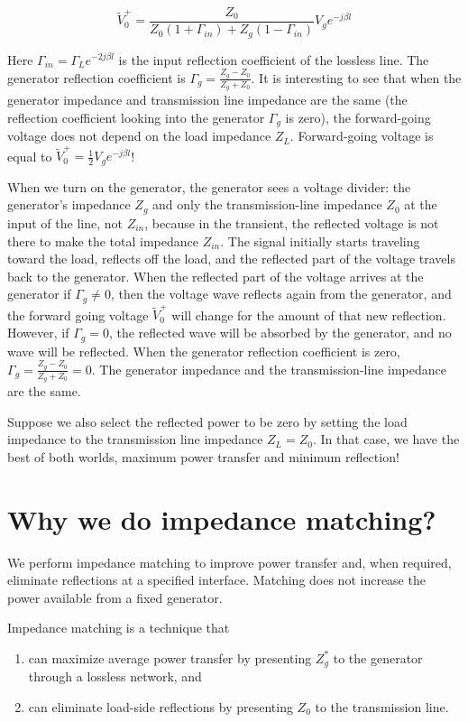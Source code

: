 \documentclass{ximera}
\begin{document}
\begin{equation}
\tilde{V}_0^+=\frac{Z_0}{Z_0(1+\Gamma_{in})+Z_g(1-\Gamma_{in})}V_g e^{-j\beta l}\label{eq:inputrefl}
\end{equation}

Here $\Gamma_{in}=\Gamma_L e^{-2j\beta l}$ is the input reflection coefficient of the lossless line. The generator reflection coefficient is $\Gamma_g=\frac{Z_g-Z_0}{Z_g+Z_0}$. It is interesting to see that when the generator impedance and transmission line impedance are the same (the reflection coefficient looking into the generator $\Gamma_{g}$ is zero), the forward-going voltage does not depend on the load impedance $Z_L$. Forward-going voltage is equal to $\tilde{V}_0^+=\frac{1}{2} V_g e^{-j \beta l}$!

When we turn on the generator, the generator sees a voltage divider: the generator's impedance $Z_g$ and only the transmission-line impedance $Z_0$ at the input of the line, not $Z_{in}$, because in the transient, the reflected voltage is not there to make the total impedance $Z_{in}$. The signal initially starts traveling toward the load, reflects off the load, and the reflected part of the voltage travels back to the generator. When the reflected part of the voltage arrives at the generator if $\Gamma_{g}\neq 0$, then the voltage wave reflects again from the generator, and the forward going voltage $\tilde{V}_0^+$ will change for the amount of that new reflection. However, if $\Gamma_{g}= 0$, the reflected wave will be absorbed by the generator, and no wave will be reflected. When the generator reflection coefficient is zero, $\Gamma_{g}=\frac{Z_g-Z_0}{Z_g+Z_0} = 0$. The generator impedance and the transmission-line impedance are the same.

Suppose we also select the reflected power to be zero by setting the load impedance to the transmission line impedance $Z_L=Z_0$. In that case, we have the best of both worlds, maximum power transfer and minimum reflection!


\section{Why we do impedance matching?}



We perform impedance matching to improve power transfer and, when required, eliminate reflections at a specified interface. Matching does not increase the power available from a fixed generator.

Impedance matching is a technique that 
\begin{enumerate}
\item can maximize average power transfer by presenting $Z_g^*$ to the generator through a lossless network, and
\item can eliminate load-side reflections by presenting $Z_0$ to the transmission line.
\end{enumerate}
\end{document}

